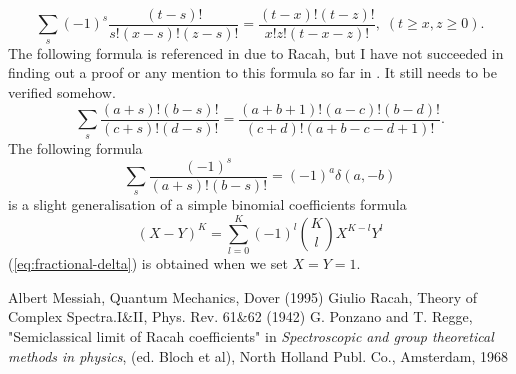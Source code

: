 \documentclass{article}
\begin{document}
\begin{equation}
\label{}
\sum_{s} (-1)^{s}\frac{(t-s)!}{s!(x-s)!(z-s)!}= \frac{(t-x)!(t-z)!}{x!z!(t-x-z)!}, \; (t \ge x,z \ge 0).
\end{equation}
The following formula is referenced in \cite{Messiah} due to Racah, but I have not succeeded in finding out a proof or any mention to this formula so far in \cite{Racah}. It still needs to be verified somehow.
\begin{equation}
\label{eq:general_binomial_coeff}
\sum_{s} \frac{(a+s)!(b-s)!}{(c+s)!(d-s)!} = \frac{(a+b+1)!(a-c)!(b-d)!}{(c+d)!(a+b-c-d+1)!}.
\end{equation}
The following formula 
\begin{equation}
\label{eq:fractional-delta}
\sum_{s} \frac{(-1)^{s}}{(a+s)!(b-s)!} = (-1)^{a} \delta(a, -b)
\end{equation}
is a slight generalisation of a simple binomial coefficients formula
\begin{equation}
\label{eq:}
(X-Y)^{K} = \sum_{l=0}^{K} (-1)^{l} \binom{K}{l} X^{K-l}Y^{l}
\end{equation}
(\ref{eq:fractional-delta}) is obtained when we set $X=Y=1$.
\begin{thebibliography}{10}
  Albert Messiah, Quantum Mechanics, Dover (1995)
  Giulio Racah, Theory of Complex Spectra.I\&II, Phys. Rev. 61\&62 (1942)
  G. Ponzano and T. Regge, "Semiclassical limit of Racah coefficients" in \textit{Spectroscopic and group theoretical methods in physics}, (ed. Bloch et al), North Holland Publ. Co., Amsterdam, 1968
\end{thebibliography}
\end{document}
